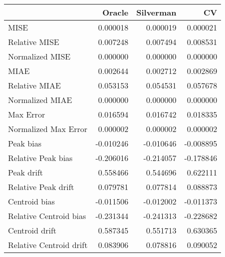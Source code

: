 \begin{tabular}{lrrr}
  \hline
 & Oracle & Silverman & CV \\ 
  \hline
MISE & 0.000018 & 0.000019 & 0.000021 \\ 
  Relative MISE & 0.007248 & 0.007494 & 0.008531 \\ 
  Normalized MISE & 0.000000 & 0.000000 & 0.000000 \\ 
  MIAE & 0.002644 & 0.002712 & 0.002869 \\ 
  Relative MIAE & 0.053153 & 0.054531 & 0.057678 \\ 
  Normalized MIAE & 0.000000 & 0.000000 & 0.000000 \\ 
  Max Error & 0.016594 & 0.016742 & 0.018335 \\ 
  Normalized Max Error & 0.000002 & 0.000002 & 0.000002 \\ 
  Peak bias & -0.010246 & -0.010646 & -0.008895 \\ 
  Relative Peak bias & -0.206016 & -0.214057 & -0.178846 \\ 
  Peak drift & 0.558466 & 0.544696 & 0.622111 \\ 
  Relative Peak drift & 0.079781 & 0.077814 & 0.088873 \\ 
  Centroid bias & -0.011506 & -0.012002 & -0.011373 \\ 
  Relative Centroid bias & -0.231344 & -0.241313 & -0.228682 \\ 
  Centroid drift & 0.587345 & 0.551713 & 0.630365 \\ 
  Relative Centroid drift & 0.083906 & 0.078816 & 0.090052 \\ 
   \hline
\end{tabular}
